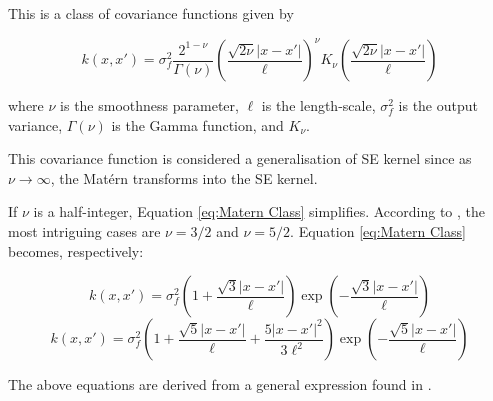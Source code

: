 \documentclass[12pt,a4paper]{article}
\begin{document}
This is a class of covariance functions given by

\begin{equation}
k(x,x') = \sigma_f^2 \frac{2^{1-\nu}}{\Gamma(\nu)} \left( \frac{\sqrt{2\nu} |x-x'|}{\ell} \right)^\nu K_\nu\left( \frac{\sqrt{2\nu} |x-x'|}{\ell} \right)
\label{eq:Matern Class}
\end{equation}

where \( \nu \) is the smoothness parameter, \( \ell \) is the length-scale, \( \sigma_f^2 \) is the output variance, \( \Gamma(\nu) \) is the Gamma function, and \( K_\nu \). \citep[see sec. 9.6]{abramowitz+stegun}

This covariance function is considered a generalisation of SE kernel since as \(\nu \to \infty\), the Mat\'{e}rn transforms into the SE kernel.

If \(\nu\) is a half-integer, Equation \eqref{eq:Matern Class} simplifies. According to \citet{williams2006gaussian}, the most intriguing cases are \(\nu = 3/2\) and \(\nu = 5/2\). Equation \eqref{eq:Matern Class} becomes, respectively:

\begin{equation*}
k(x,x') = \sigma_f^2 \left( 1 + \frac{\sqrt{3} |x-x'|}{\ell} \right) \exp\left(-\frac{\sqrt{3} |x-x'|}{\ell}\right)
\end{equation*}
\begin{equation*}
k(x,x') = \sigma_f^2 \left( 1 + \frac{\sqrt{5} |x-x'|}{\ell} + \frac{5 |x-x'|^2}{3\ell^2} \right) \exp\left(-\frac{\sqrt{5} |x-x'|}{\ell}\right)
\end{equation*}

The above equations are derived from a general expression found in \citet[eq. 10.2.15]{abramowitz+stegun}.
\end{document}

